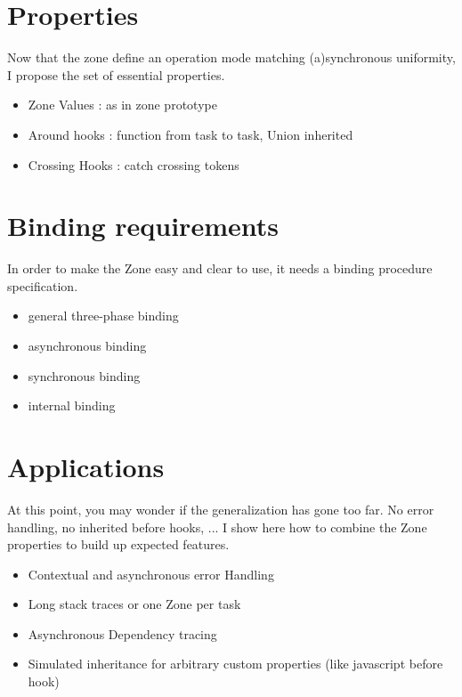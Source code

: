 \section{Properties}

Now that the zone define an operation mode matching (a)synchronous uniformity, I propose the set of essential properties.

\begin{itemize}
\item Zone Values : as in zone prototype
\item Around hooks : function from task to task, Union inherited
\item Crossing Hooks : catch crossing tokens
\end{itemize}

\section{Binding requirements}

In order to make the Zone easy and clear to use, it needs a binding procedure specification.

\begin{itemize}
\item general three-phase binding
\item asynchronous binding
\item synchronous binding
\item internal binding
\end{itemize}

\section{Applications}

At this point, you may wonder if the generalization has gone too far. No error handling, no inherited before hooks, ... I show here how to combine the Zone properties to build up expected features.

\begin{itemize}
\item Contextual and asynchronous error Handling
\item Long stack traces or one Zone per task
\item Asynchronous Dependency tracing
\item Simulated inheritance for arbitrary custom properties (like javascript before hook)
\end{itemize}